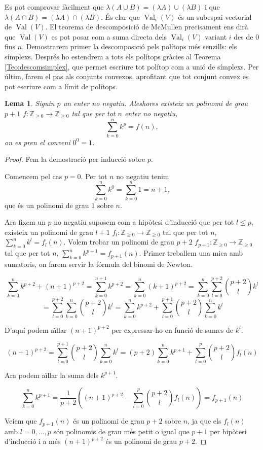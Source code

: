 \documentclass{article}
\newtheorem{lema}{Lema}
\theoremstyle{definition}
\DeclareMathOperator{\Val}{Val}
\begin{document}
Es pot comprovar f\`{a}cilment que $\lambda(A\cup B)=(\lambda A)\cup(\lambda B)$ i que $\lambda(A\cap B)=(\lambda A)\cap(\lambda B)$. \'{E}s clar que $\Val_i(V)$ \'{e}s un subespai vectorial de $\Val(V)$. El teorema de descomposici\'{o} de McMullen precisament ens dir\`{a} que $\Val(V)$ es pot posar com a suma directa dels $\Val_i(V)$ variant $i$ des de $0$ fins $n$. Demostrarem primer la descomposici\'{o} pels pol\'{i}tops m\'{e}s senzills: els s\'{i}mplexs. Despr\'{e}s ho estendrem a tots els pol\'{i}tops gr\`{a}cies al Teorema \ref{Teo:descomsimplex}, que permet escriure tot pol\'{i}top com a uni\'{o} de s\'{i}mplexs. Per \'{u}ltim, farem el pas als conjunts convexos, aprofitant que tot conjunt convex es pot escriure com a l\'{i}mit de pol\'{i}tops.

\begin{lema}\label{Lem:polisuma}
Siguin $p$ un enter no negatiu. Aleshores existeix un polinomi de grau $p+1$ $f:\mathbb{Z}_{\geq0}\rightarrow\mathbb{Z}_{\geq0}$ tal que per tot $n$ enter no negatiu,
\[\sum_{k=0}^nk^p=f(n),\]
on es pren el conveni $0^0=1$.
\end{lema}
\begin{proof}
Fem la demostraci\'{o} per inducci\'{o} sobre $p$.

Comencem pel cas $p=0$. Per tot $n$ no negatiu tenim
\[\sum_{k=0}^nk^0=\sum_{k=0}^n1=n+1,\]
que \'{e}s un polinomi de grau $1$ sobre $n$.

Ara fixem un $p$ no negatiu suposem com a hip\`{o}tesi d'inducci\'{o} que per tot $l\leq p$, existeix un polinomi de grau $l+1$ $f_l:\mathbb{Z}_{\geq0}\rightarrow\mathbb{Z}_{\geq0}$ tal que per tot $n$, $\sum_{k=0}^nk^l=f_l(n)$. Volem trobar un polinomi de grau $p+2$ $f_{p+1}:\mathbb{Z}_{\geq0}\rightarrow\mathbb{Z}_{\geq0}$ tal que per tot $n$, $\sum_{k=0}^nk^{p+1}=f_{p+1}(n)$. Primer treballem una mica amb sumatoris, on farem servir la f\'{o}rmula del binomi de Newton.

\[\sum_{k=0}^nk^{p+2}+(n+1)^{p+2}=\sum_{k=0}^{n+1}k^{p+2}=\sum_{k=0}^n(k+1)^{p+2}=\sum_{k=0}^n\sum_{l=0}^{p+2}\binom{p+2}{l}k^l\]
\[=\sum_{l=0}^{p+2}\sum_{k=0}^n\binom{p+2}{l}k^l=\sum_{k=0}^nk^{p+2}+\sum_{l=0}^{p+1}\binom{p+2}{l}\sum_{k=0}^nk^l\]

D'aqu\'{i} podem a\"{i}llar $(n+1)^{p+2}$ per expressar-ho en funci\'{o} de sumes de $k^l$.

\[(n+1)^{p+2}=\sum_{l=0}^{p+1}\binom{p+2}{l}\sum_{k=0}^nk^l=(p+2)\sum_{k=0}^nk^{p+1}+\sum_{l=0}^p\binom{p+2}{l}f_l(n)\]

Ara podem a\"{i}llar la suma dels $k^{p+1}$.

\[\sum_{k=0}^nk^{p+1}=\frac{1}{p+2}\left((n+1)^{p+2}-\sum_{l=0}^p\binom{p+2}{l}f_l(n)\right)=f_{p+1}(n)\]

Veiem que $f_{p+1}(n)$ \'{e}s un polinomi de grau $p+2$ sobre $n$, ja que els $f_l(n)$ amb $l=0,\ldots,p$ s\'{o}n polinomis de grau m\'{e}s petit o igual que $p+1$ per hip\`{o}tesi d'inducci\'{o} i a m\'{e}s $(n+1)^{p+2}$ \'{e}s un polinomi de grau $p+2$.
\end{proof}
\end{document}
